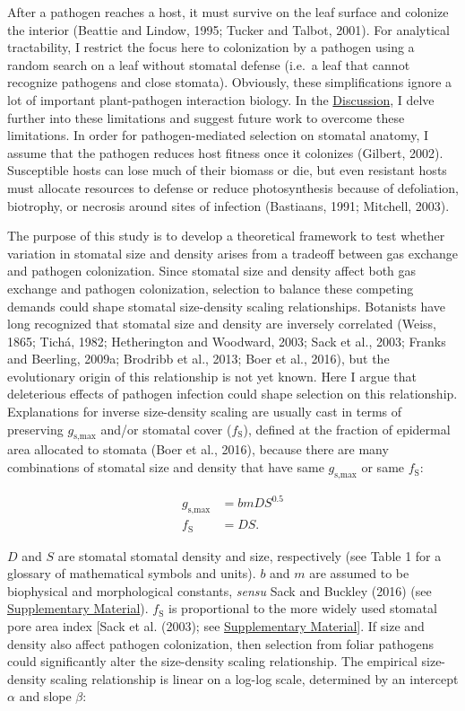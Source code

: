 \documentclass[utf8]{frontiersSCNS}
\newcommand{\fs}{$f_\text{S}$}
\newcommand{\gsmax}{$g_\text{s,max}$}
\begin{document}
After a pathogen reaches a host, it must survive on the leaf surface and
colonize the interior (Beattie and Lindow, 1995; Tucker and Talbot,
2001). For analytical tractability, I restrict the focus here to
colonization by a pathogen using a random search on a leaf without
stomatal defense (i.e.~a leaf that cannot recognize pathogens and close
stomata). Obviously, these simplifications ignore a lot of important
plant-pathogen interaction biology. In the
\protect\hyperlink{discussion}{Discussion}, I delve further into these
limitations and suggest future work to overcome these limitations. In
order for pathogen-mediated selection on stomatal anatomy, I assume that
the pathogen reduces host fitness once it colonizes (Gilbert, 2002).
Susceptible hosts can lose much of their biomass or die, but even
resistant hosts must allocate resources to defense or reduce
photosynthesis because of defoliation, biotrophy, or necrosis around
sites of infection (Bastiaans, 1991; Mitchell, 2003).

The purpose of this study is to develop a theoretical framework to test
whether variation in stomatal size and density arises from a tradeoff
between gas exchange and pathogen colonization. Since stomatal size and
density affect both gas exchange and pathogen colonization, selection to
balance these competing demands could shape stomatal size-density
scaling relationships. Botanists have long recognized that stomatal size
and density are inversely correlated (Weiss, 1865; Tichá, 1982;
Hetherington and Woodward, 2003; Sack et al., 2003; Franks and Beerling,
2009a; Brodribb et al., 2013; Boer et al., 2016), but the evolutionary
origin of this relationship is not yet known. Here I argue that
deleterious effects of pathogen infection could shape selection on this
relationship. Explanations for inverse size-density scaling are usually
cast in terms of preserving \gsmax{} and/or stomatal cover (\fs),
defined at the fraction of epidermal area allocated to stomata (Boer et
al., 2016), because there are many combinations of stomatal size and
density that have same \gsmax{} or same \fs{}:

\begin{align}
  g_\text{s,max} & = b m D S ^ {0.5} \label{eq:gsmax} \\
  f_\text{S} & = D S \label{eq:fs}.
\end{align}

\(D\) and \(S\) are stomatal stomatal density and size, respectively
(see Table 1 for a glossary of mathematical symbols and units). \(b\)
and \(m\) are assumed to be biophysical and morphological constants,
\emph{sensu} Sack and Buckley (2016) (see
\protect\hyperlink{supplementary-material}{Supplementary Material}).
\fs{} is proportional to the more widely used stomatal pore area index
{[}Sack et al. (2003); see
\protect\hyperlink{supplementary-material}{Supplementary Material}{]}.
If size and density also affect pathogen colonization, then selection
from foliar pathogens could significantly alter the size-density scaling
relationship. The empirical size-density scaling relationship is linear
on a log-log scale, determined by an intercept \(\alpha\) and slope
\(\beta\):
\end{document}
